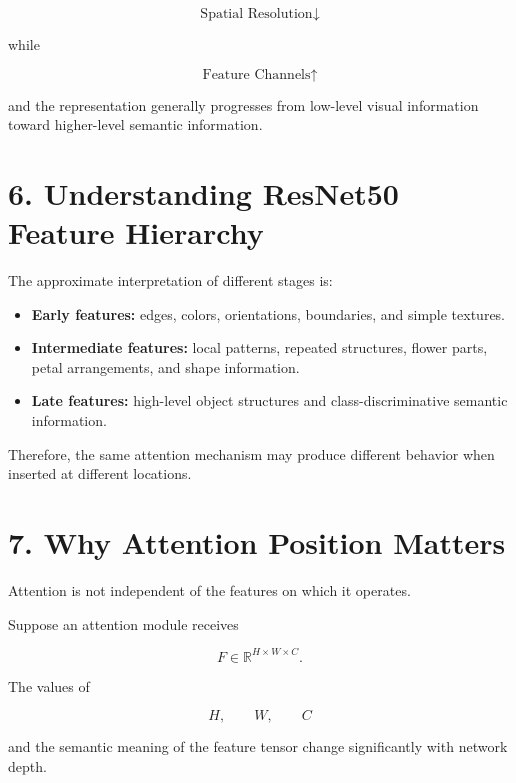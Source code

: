 \documentclass[10pt]{article}
\begin{document}
\[
\boxed{
\text{Spatial Resolution}\downarrow
}
\]

while

\[
\boxed{
\text{Feature Channels}\uparrow
}
\]

and the representation generally progresses from low-level visual
information toward higher-level semantic information.

\section*{6. Understanding ResNet50 Feature Hierarchy}

The approximate interpretation of different stages is:

\begin{itemize}

\item \textbf{Early features:}
edges, colors, orientations, boundaries, and simple textures.

\item \textbf{Intermediate features:}
local patterns, repeated structures, flower parts, petal arrangements, and
shape information.

\item \textbf{Late features:}
high-level object structures and class-discriminative semantic information.

\end{itemize}

Therefore, the same attention mechanism may produce different behavior when
inserted at different locations.

\section*{7. Why Attention Position Matters}

Attention is not independent of the features on which it operates.

Suppose an attention module receives

\[
F\in\mathbb{R}^{H\times W\times C}.
\]

The values of

\[
H,\qquad W,\qquad C
\]

and the semantic meaning of the feature tensor change significantly with
network depth.
\end{document}
